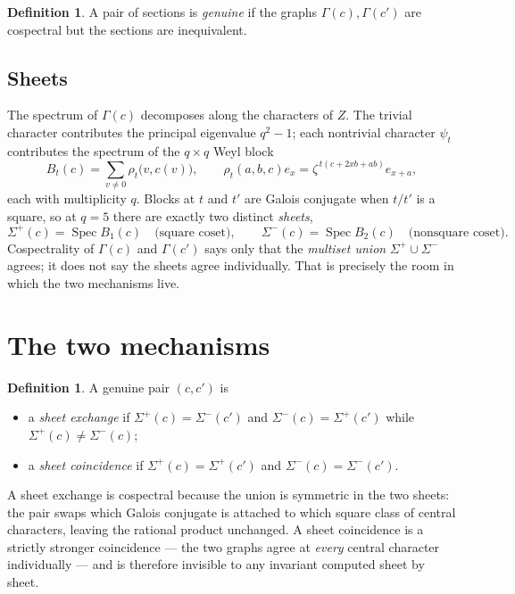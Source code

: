 \documentclass[11pt]{article}
\theoremstyle{plain}
\theoremstyle{definition}
\newtheorem{definition}[theorem]{Definition}
\newcommand{\Spec}{\operatorname{Spec}}
\begin{document}
\begin{definition}
A pair of sections is \emph{genuine} if the graphs $\Gamma(c),\Gamma(c')$ are
cospectral but the sections are inequivalent.
\end{definition}

\subsection*{Sheets}

The spectrum of $\Gamma(c)$ decomposes along the characters of $Z$. The trivial
character contributes the principal eigenvalue $q^2-1$; each nontrivial
character $\psi_t$ contributes the spectrum of the $q\times q$ Weyl block
\[
B_t(c)=\sum_{v\neq0}\rho_t\bigl(v,c(v)\bigr),
\qquad
\rho_t(a,b,c)e_x=\zeta^{\,t(c+2xb+ab)}e_{x+a},
\]
each with multiplicity $q$. Blocks at $t$ and $t'$ are Galois conjugate when
$t/t'$ is a square, so at $q=5$ there are exactly two distinct
\emph{sheets},
\[
\Sigma^{+}(c)=\Spec B_1(c)\quad\text{(square coset)},\qquad
\Sigma^{-}(c)=\Spec B_2(c)\quad\text{(nonsquare coset)} .
\]
Cospectrality of $\Gamma(c)$ and $\Gamma(c')$ says only that the
\emph{multiset union} $\Sigma^{+}\cup\Sigma^{-}$ agrees; it does not say the
sheets agree individually. That is precisely the room in which the two
mechanisms live.

\section{The two mechanisms}

\begin{definition}
A genuine pair $(c,c')$ is
\begin{itemize}
\item a \emph{sheet exchange} if
$\Sigma^{+}(c)=\Sigma^{-}(c')$ and $\Sigma^{-}(c)=\Sigma^{+}(c')$ while
$\Sigma^{+}(c)\neq\Sigma^{-}(c)$;
\item a \emph{sheet coincidence} if
$\Sigma^{+}(c)=\Sigma^{+}(c')$ and $\Sigma^{-}(c)=\Sigma^{-}(c')$.
\end{itemize}
\end{definition}

A sheet exchange is cospectral because the union is symmetric in the two
sheets: the pair swaps which Galois conjugate is attached to which square
class of central characters, leaving the rational product unchanged. A sheet
coincidence is a strictly stronger coincidence --- the two graphs agree at
\emph{every} central character individually --- and is therefore invisible to
any invariant computed sheet by sheet.
\end{document}
